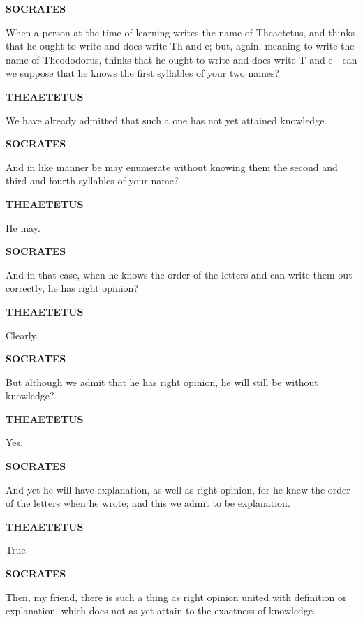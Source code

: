 \documentclass[11pt,letter]{article}
\begin{document}
\par \textbf{SOCRATES}
\par   When a person at the time of learning writes the name of Theaetetus, and thinks that he ought to write and does write Th and e; but, again, meaning to write the name of Theododorus, thinks that he ought to write and does write T and e—can we suppose that he knows the first syllables of your two names?

\par \textbf{THEAETETUS}
\par   We have already admitted that such a one has not yet attained knowledge.

\par \textbf{SOCRATES}
\par   And in like manner be may enumerate without knowing them the second and third and fourth syllables of your name?

\par \textbf{THEAETETUS}
\par   He may.

\par \textbf{SOCRATES}
\par   And in that case, when he knows the order of the letters and can write them out correctly, he has right opinion?

\par \textbf{THEAETETUS}
\par   Clearly.

\par \textbf{SOCRATES}
\par   But although we admit that he has right opinion, he will still be without knowledge?

\par \textbf{THEAETETUS}
\par   Yes.

\par \textbf{SOCRATES}
\par   And yet he will have explanation, as well as right opinion, for he knew the order of the letters when he wrote; and this we admit to be explanation.

\par \textbf{THEAETETUS}
\par   True.

\par \textbf{SOCRATES}
\par   Then, my friend, there is such a thing as right opinion united with definition or explanation, which does not as yet attain to the exactness of knowledge.
\end{document}

